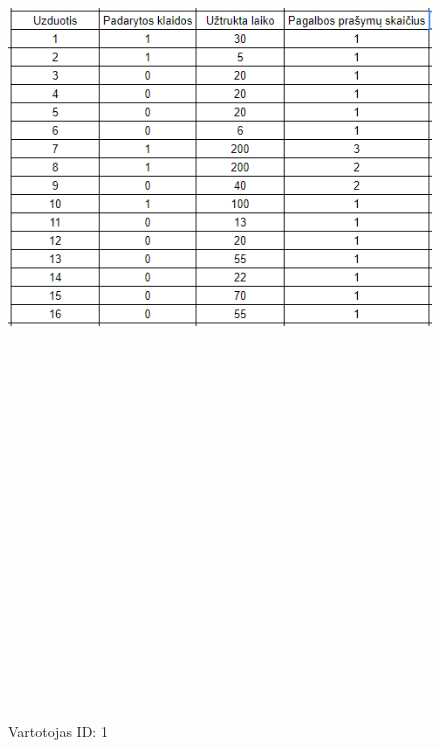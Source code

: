 \documentclass[oneside]{VUMIFPSkursinis}
\begin{document}
	\begin{figure}[ht]
			\centering
			\includegraphics[width=15cm,height=60cm,keepaspectratio]{1.png}
			\caption{ Vartotojas ID: 1}
	\end{figure}
\end{document}
